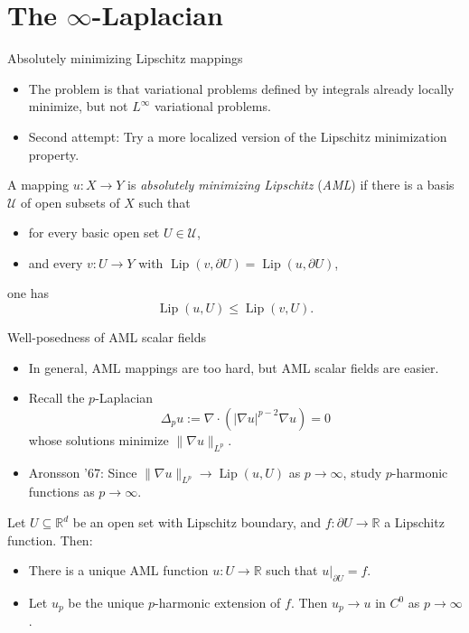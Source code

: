 \documentclass[10pt]{beamer}
\newcommand{\RR}{\mathbb{R}}
\DeclareMathOperator{\Lip}{Lip}
\begin{document}
\section{The \texorpdfstring{$\infty$-Laplacian}{infinity-Laplacian}}

\begin{frame}{Absolutely minimizing Lipschitz mappings}
\begin{itemize}
\item The problem is that variational problems defined by integrals already locally minimize, but not $L^\infty$ variational problems. 
\item Second attempt: Try a more localized version of the Lipschitz minimization property. 
\end{itemize}

\begin{definition}
A mapping $u: X \to Y$ is \emph{absolutely minimizing Lipschitz} (\emph{AML}) if there is a basis $\mathscr U$ of open subsets of $X$ such that
\begin{itemize}
\item for every basic open set $U \in \mathscr U$,
\item and every $v: U \to Y$ with $\Lip(v, \partial U) = \Lip(u, \partial U)$, 
\end{itemize}
one has
$$\Lip(u, U) \leq \Lip(v, U).$$
\end{definition}
\end{frame}

\begin{frame}{Well-posedness of AML scalar fields}
\begin{itemize}
\item In general, AML mappings are too hard, but AML scalar fields are easier. 
\item Recall the $p$-Laplacian 
$$\Delta_p u := \nabla \cdot (|\nabla u|^{p - 2} \nabla u) = 0$$
whose solutions minimize $\|\nabla u\|_{L^p}$. 
\item Aronsson '67: Since $\|\nabla u\|_{L^p} \to \Lip(u, U)$ as $p \to \infty$, study $p$-harmonic functions as $p \to \infty$. 
\end{itemize}

\begin{theorem}
Let $U \subseteq \RR^d$ be an open set with Lipschitz boundary, and $f: \partial U \to \RR$ a Lipschitz function. Then: 
\begin{itemize}
\item There is a unique AML function $u: U \to \RR$ such that $u|_{\partial U} = f$. 
\item Let $u_p$ be the unique $p$-harmonic extension of $f$.
Then $u_p \to u$ in $C^0$ as $p \to \infty$.
\end{itemize}
\end{theorem}
\end{frame}
\end{document}
